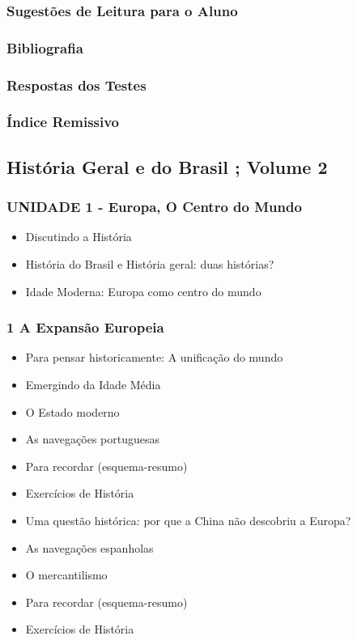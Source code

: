 \documentclass[a4paper,12pt]{article}[abntex2]
\begin{document}
\subsubsection*{Sugestões de Leitura para o Aluno}

\subsubsection*{Bibliografia}

\subsubsection*{Respostas dos Testes}

\subsubsection*{Índice Remissivo}

\subsection{História Geral e do Brasil ; Volume 2}
\subsubsection*{UNIDADE 1 - Europa, O Centro do Mundo}

\begin{itemize}
\item Discutindo a História
\item História do Brasil e História geral: duas histórias?
\item Idade Moderna: Europa como centro do mundo
\end{itemize}
\subsubsection*{1 A Expansão Europeia}

\begin{itemize}
\item Para pensar historicamente: A unificação do mundo
\item Emergindo da Idade Média
\item O Estado moderno
\item As navegações portuguesas
\item Para recordar (esquema-resumo)
\item Exercícios de História
\item Uma questão histórica: por que a China não descobriu a Europa?
\item As navegações espanholas
\item O mercantilismo
\item Para recordar (esquema-resumo)
\item Exercícios de História
\end{itemize}
\end{document}
